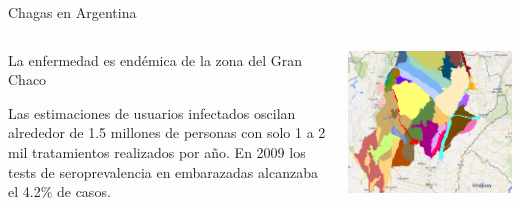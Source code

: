 \documentclass{beamer}
\begin{document}
\begin{frame}{Chagas en Argentina}
	\begin{columns}
		\begin{column}{0.45\textwidth}
			La enfermedad es endémica de la zona del Gran Chaco

			\medskip Las estimaciones de usuarios infectados oscilan alrededor de 1.5 millones de personas con solo 1 a 2 mil tratamientos realizados por año. En 2009 los tests de seroprevalencia en embarazadas alcanzaba el 4.2\% de casos.

			\medskip

		\end{column}
		\begin{column}{0.45\textwidth}
			\includegraphics[height=.7\textheight]{slides/Ambientes_GranChaco_TNC-Argentina.png}
		\end{column}
	\end{columns}
\end{frame}
\end{document}
